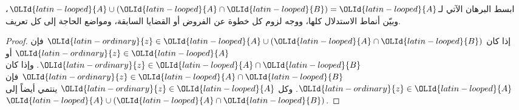 \documentclass[../../../include/open-logic-section]{subfiles}
\begin{document}
\begin{prob}
ابسط البرهان الآتي لـ${\OLId{latin-looped}{A}} \cup ({\OLId{latin-looped}{A}} \cap {\OLId{latin-looped}{B}}) = {\OLId{latin-looped}{A}}$، وبيّن أنماط الاستدلال
كلها، ووجه لزوم كل خطوة عن الفروض أو القضايا السابقة، ومواضع الحاجة
إلى كل تعريف.
\begin{proof}
  إذا كان ${\OLId{latin-ordinary}{z}} \in {\OLId{latin-looped}{A}} \cup ({\OLId{latin-looped}{A}} \cap {\OLId{latin-looped}{B}})$ فإن ${\OLId{latin-ordinary}{z}} \in {\OLId{latin-looped}{A}}$ أو
  ${\OLId{latin-ordinary}{z}} \in {\OLId{latin-looped}{A}} \cap {\OLId{latin-looped}{B}}$. وإذا كان ${\OLId{latin-ordinary}{z}} \in {\OLId{latin-looped}{A}} \cap {\OLId{latin-looped}{B}}$ فإن ${\OLId{latin-ordinary}{z}} \in {\OLId{latin-looped}{A}}$. وكل
  ${\OLId{latin-ordinary}{z}} \in {\OLId{latin-looped}{A}}$ ينتمي أيضاً إلى ${\OLId{latin-looped}{A}} \cup ({\OLId{latin-looped}{A}} \cap {\OLId{latin-looped}{B}})$.
\end{proof}
\end{prob}
\end{document}
